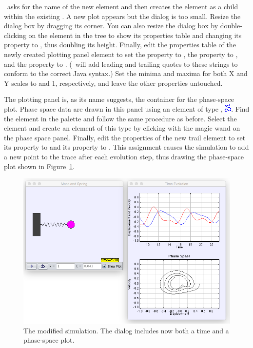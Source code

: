 \ejs\ asks for the name of the new element and then creates the element as a child within the existing . A
new plot appears but the dialog is too small.  Resize the dialog box by dragging its
corner. You can also resize the dialog box by double-clicking on the  element in the tree to show its
properties table and changing its  property to , thus doubling its height. Finally, edit the
properties table of the newly created plotting panel element to set the  property to ,
the  property to , and the  property to . (\ejs\ will
add leading and trailing quotes to these strings to conform to the correct Java syntax.) Set the minima
and maxima for both X and Y scales to  and {1}, respectively, and leave the other properties untouched.

The plotting panel is, as its name suggests, the container for the phase-space plot. Phase space data are drawn in this
panel using an element of type , \includegraphics[scale=\linescale]{../_common/icons_png/Elements/Trail.png}.  Find the
 element in the  palette and follow the same procedure as before.  Select the
 element and create an element of this type by clicking with the magic wand on the phase space panel.
Finally, edit the properties of the new trail element to set its  property to  and its
 property to . This assignment causes the simulation to add a new  point to the
trace after each evolution step, thus drawing the phase-space plot shown in Figure~\ref{fig:02ExplorationJava/ModifyRunning}.

\begin{figure}[htb]
  \centering
  \includegraphics[scale=\scale]{02ExplorationJava/images/ModifyRunning.png}
  \caption{The modified simulation. The dialog includes now both a time and a phase-space plot.}
  \label{fig:02ExplorationJava/ModifyRunning}
\end{figure}

